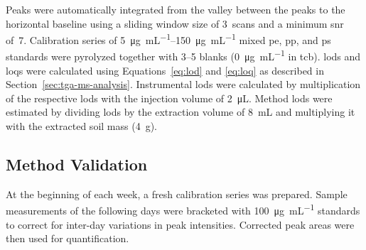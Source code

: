 Peaks were automatically integrated from the valley between the peaks to the horizontal baseline using a sliding window size of 3~scans and a minimum \ac{snr} of~7.
Calibration series of \SIrange{5}{150}{\micro\gram\per\milli\liter} mixed \ac{pe}, \ac{pp}, and \ac{ps} standards were pyrolyzed together with \numrange{3}{5} blanks (\SI{0}{\micro\gram\per\milli\liter} in \ac{tcb}).
\Acp{lod} and \acp{loq} were calculated using Equations~\ref{eq:lod} and \ref{eq:loq} as described in Section~\ref{sec:tga-ms-analysis}.
%
%
%
Instrumental \acp{lod} were calculated by multiplication of the respective \acp{lod} with the injection volume of \SI{2}{\micro\liter}. Method \acp{lod} were estimated by dividing \acp{lod} by the extraction volume of \SI{8}{\milli\liter} and multiplying it with the extracted soil mass (\SI{4}{\gram}).

\subsection{Method Validation}

At the beginning of each week, a fresh calibration series was prepared. Sample measurements of the following days were bracketed with \SI{100}{\micro\gram\per\milli\liter} standards to correct for inter-day variations in peak intensities. Corrected peak areas were then used for quantification.

